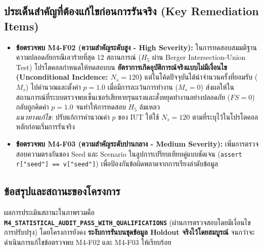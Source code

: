 \documentclass[10pt,a4paper]{article}
\begin{document}
{\subsection{ประเด็นสำคัญที่ต้องแก้ไขก่อนการรันจริง (Key Remediation Items)}
\begin{itemize}
    \item \textbf{ข้อตรวจพบ M4-F02 (ความสำคัญระดับสูง - High Severity):} ในการทดสอบสมมติฐานความปลอดภัยกรณีเลวร้ายที่สุด 12 สถานการณ์ ($H_5$ ผ่าน Berger Intersection-Union Test) โปรโตคอลกำหนดให้ทดสอบบน \textbf{อัตราการเกิดอุบัติการณ์จริงแบบไม่มีเงื่อนไข (Unconditional Incidence: $N_s = 120$)} แต่ในโค้ดปัจจุบันได้นำจำนวนครั้งที่ยอมรับ ($M_s$) ไปคำนวณและตั้งค่า $p = 1.0$ เมื่อมีการละเว้นการทำงาน ($M_s = 0$) ส่งผลให้ในสถานการณ์ที่ระบบตรวจพบเซ็นเซอร์เสียหายรุนแรงและสั่งหยุดทำงานอย่างปลอดภัย ($FS = 0$) กลับถูกคิดค่า $p = 1.0$ จนทำให้การทดสอบ $H_5$ ล้มเหลว\\
    \textit{แนวทางแก้ไข:} ปรับแก้การคำนวณค่า $p$ ของ IUT ให้ใช้ $N_s = 120$ ตามที่ระบุไว้ในโปรโตคอลหลักก่อนเริ่มการรันจริง
    \item \textbf{ข้อตรวจพบ M4-F03 (ความสำคัญระดับปานกลาง - Medium Severity):} เพิ่มการตรวจสอบความตรงกันของ Seed และ Scenario ในลูปการเปรียบเทียบคู่แบบชัดเจน (\texttt{assert r["seed"] == v["seed"]}) เพื่อป้องกันข้อผิดพลาดจากการเรียงลำดับข้อมูล
\end{itemize}

\subsection{ข้อสรุปและสถานะของโครงการ}
ผลการประเมินสถานะในภาพรวมคือ \textbf{\texttt{M4\_STATISTICAL\_AUDIT\_PASS\_WITH\_QUALIFICATIONS}} (ผ่านการตรวจสอบโดยมีเงื่อนไขการปรับปรุง) โดยโครงการยังคง \textbf{ระงับการรันบนชุดข้อมูล Holdout จริงไว้โดยสมบูรณ์} จนกว่าจะดำเนินการแก้ไขข้อตรวจพบ M4-F02 และ M4-F03 ให้เรียบร้อย
}
\end{document}
